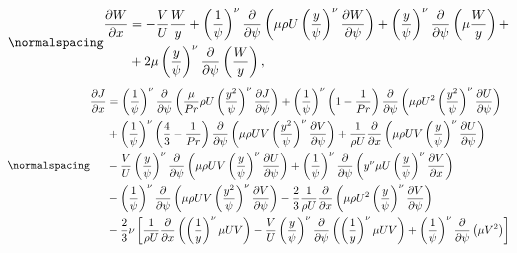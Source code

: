 \begin{equation}
\label{eq1:navie_parabol4}
\normalspacing
\begin{split}
\frac{\partial W}{\partial x}&=-\frac{V}{U} \frac{W}{y}+\left(\frac{1}{\psi}\right)^\nu \frac{\partial}{\partial \psi}\left(\mu \rho U\left(\frac{y}{\psi}\right)^\nu \frac{\partial W}{\partial \psi}\right)+\left(\frac{y}{\psi}\right)^\nu \frac{\partial}{\partial \psi}\left(\mu \frac{W}{y}\right)+\\
&+2 \mu\left(\frac{y}{\psi}\right)^\nu \frac{\partial}{\partial \psi}\left(\frac{W}{y}\right) \text {, } \\
\end{split}
\end{equation}
\begin{equation}
\label{eq1:navie_parabol5}
\normalspacing
\begin{split}
\frac{\partial J}{\partial x}&=\left(\frac{1}{\psi}\right)^\nu \frac{\partial}{\partial \psi}\left(\frac{\mu}{P r} \rho U\left(\frac{y^{2}}{\psi}\right)^\nu \frac{\partial J}{\partial \psi}\right)+\left(\frac{1}{\psi}\right)^\nu\left(1-\frac{1}{P r}\right) \frac{\partial}{\partial \psi}\left(\mu \rho U^{2}\left(\frac{y^{2}}{\psi}\right)^\nu \frac{\partial U}{\partial \psi}\right) \\
&+\left(\frac{1}{\psi}\right)^\nu\left(\frac{4}{3}-\frac{1}{P r}\right) \frac{\partial}{\partial \psi}\left(\mu \rho U V\left(\frac{y^{2}}{\psi}\right)^\nu \frac{\partial V}{\partial \psi}\right)+\frac{1}{\rho U} \frac{\partial}{\partial x}\left(\mu \rho U V\left(\frac{y}{\psi}\right)^\nu \frac{\partial U}{\partial \psi}\right) \\
&-\frac{V}{U}\left(\frac{y}{\psi}\right)^\nu \frac{\partial}{\partial \psi}\left(\mu \rho U V\left(\frac{y}{\psi}\right)^\nu \frac{\partial U}{\partial \psi}\right)+\left(\frac{1}{\psi}\right)^\nu \frac{\partial}{\partial \psi}\left(y^\nu \mu U\left(\frac{y}{\psi}\right)^\nu \frac{\partial V}{\partial x}\right) \\
&-\left(\frac{1}{\psi}\right)^\nu \frac{\partial}{\partial \psi}\left(\mu \rho U V\left(\frac{y^{2}}{\psi}\right)^\nu \frac{\partial V}{\partial \psi}\right)-\frac{2}{3} \frac{1}{\rho U} \frac{\partial}{\partial x}\left(\mu \rho U^{2}\left(\frac{y}{\psi}\right)^\nu \frac{\partial V}{\partial \psi}\right) \\
&-\frac{2}{3} \nu\left[\frac{1}{\rho U} \frac{\partial}{\partial x}\left(\left(\frac{1}{y}\right)^\nu \mu U V\right)-\frac{V}{U}\left(\frac{y}{\psi}\right)^\nu \frac{\partial}{\partial \psi}\left(\left(\frac{1}{y}\right)^\nu \mu U V\right)+\left(\frac{1}{\psi}\right)^\nu \frac{\partial}{\partial \psi}\left(\mu V^{2}\right)\right] \\

\end{split}
\end{equation}
